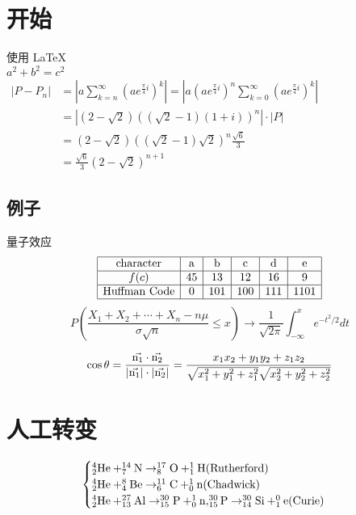 \documentclass[UTF8]{article}
\begin{document}
       
 
\section{开始}   
使用       
\LaTeX \,\\ 
 $a^2+b^2=c^2$\\
 $\begin{aligned}
    \left|P-P_{n}\right|&=\left|a \sum_{k=n}^{\infty}\left(a e^{\frac{\pi}{4} i}\right)^{k}\right|=\left|a\left(a e^{\frac{\pi}{4} i}\right)^{n} \sum_{k=0}^{\infty}\left(a e^{\frac{\pi}{4} i}\right)^{k}\right|\\&=\left|(2-\sqrt{2})((\sqrt{2}-1)(1+i))^{n}\right| \cdot|P|\\&=(2-\sqrt{2})((\sqrt{2}-1) \sqrt{2})^{n} \frac{\sqrt{6}}{3}\\&=\frac{\sqrt{6}}{3}(2-\sqrt{2})^{n+1}\end{aligned}$

\subsection{例子}  

量子效应\cite{Can}
\\
$$\begin{array}{|c|c|c|c|c|c|}
    \hline
    \text{character}&\text{a}&\text{b}&\text{c}&\text{d}&\text{e}\\
    \hline
    f(c)&45&13&12&16&9\\
    \hline
    \text{Huffman Code}&0&101&100&111&1101\\
    \hline
    \end{array}$$
$$P\left(\frac{X_{1}+X_{2}+\cdots+X_{n}-n \mu}{\sigma \sqrt{n}} \leq x\right)\to \frac{1}{\sqrt{2 \pi}} \int_{-\infty}^{x} e^{-t^{2} / 2} d t$$



$$
\cos\theta=\frac{\vec{\rm{n_1}}\cdot\vec{\rm{n_2}}  }{|\vec{\rm{n_1}}|\cdot|\vec{\rm{n_2}}|}=\frac{x_{1} x_{2}+y_{1} y_{2}+z_{1} z_{2}}{\sqrt{x_{1}^{2}+y_{1}^{2}+z_{1}^{2}} \sqrt{x_{2}^{2}+y_{2}^{2}+z_{2}^{2}}}
$$
\section{人工转变}

$$
\begin{cases}\rm
    _{2}^{4}He+ _{7}^{14}N \rightarrow _{8}^{17}O + _{1}^{1}H(Rutherford)\\\rm
    _{2}^{4}He+ _{4}^{8}Be \rightarrow _{6}^{11}C + _{0}^{1}n(Chadwick)\\\rm
    _{2}^{4}He+ _{13}^{27}Al \rightarrow _{15}^{30}P + _{0}^{1}n,_{15}^{30}P \rightarrow _{14}^{30}Si + _{1}^{0}e(Curie)
    \end{cases}
$$
\end{document}
